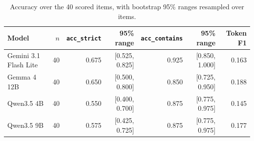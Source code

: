 \begin{table}[htbp]
\centering
\caption{Accuracy over the 40 scored items, with bootstrap 95\% ranges resampled over items.}
\label{tab:accuracy}
{\small
\begin{tabular}{@{}lrrrrrr@{}}
\toprule
Model & $n$ & \texttt{acc\_strict} & 95\% range & \texttt{acc\_contains} & 95\% range & Token F1 \\
\midrule
Gemini 3.1 Flash Lite & 40 & 0.675 & [0.525, 0.825] & 0.925 & [0.850, 1.000] & 0.163 \\
Gemma 4 12B & 40 & 0.650 & [0.500, 0.800] & 0.850 & [0.725, 0.950] & 0.188 \\
Qwen3.5 4B & 40 & 0.550 & [0.400, 0.700] & 0.875 & [0.775, 0.975] & 0.145 \\
Qwen3.5 9B & 40 & 0.575 & [0.425, 0.725] & 0.875 & [0.775, 0.975] & 0.177 \\
\bottomrule
\end{tabular}}
\end{table}
